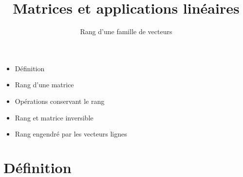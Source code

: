 

   





\title{{\bf Matrices et applications linéaires}}
\subtitle{Rang d'une famille de vecteurs}

\begin{frame}
  
  \debutmontitre

  \pause

{\footnotesize
\hfill
{}
\begin{minipage}{0.6\textwidth}
  \begin{itemize}
    \item<3-> Définition
    \item<4-> Rang d'une matrice
    \item<5-> Opérations conservant le rang
    \item<6-> Rang et matrice inversible
    \item<7-> Rang engendré par les vecteurs lignes
  \end{itemize}
\end{minipage}
}

\end{frame}

\setcounter{framenumber}{0}


\section{Définition}

